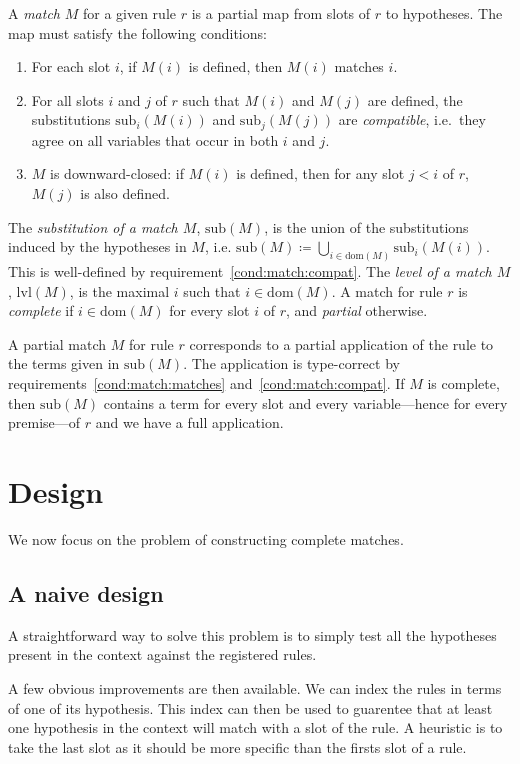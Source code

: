 \documentclass[runningheads]{llncs}
\newcommand{\dom}{\ensuremath{\mathrm{dom}}}
\newcommand{\sub}{\ensuremath{\mathrm{sub}}}
\newcommand{\lvl}{\ensuremath{\mathrm{lvl}}}
\begin{document}
A \textit{match} $M$ for a given rule $r$ is a partial map from slots of $r$ to hypotheses.
The map must satisfy the following conditions:
\begin{enumerate}
  \item\label{cond:match:matches} For each slot $i$, if $M(i)$ is defined, then $M(i)$ matches $i$.
  \item\label{cond:match:compat} For all slots $i$ and $j$ of $r$ such that $M(i)$ and $M(j)$ are defined, the substitutions $\sub_{i}(M(i))$ and $\sub_{j}(M(j))$ are \emph{compatible}, i.e.\ they agree on all variables that occur in both $i$ and $j$.
  \item\label{cond:match:closed} $M$ is downward-closed: if $M(i)$ is defined, then for any slot $j < i$ of $r$, $M(j)$ is also defined.
\end{enumerate}
The \emph{substitution of a match $M$}, $\sub(M)$, is the union of the substitutions induced by the hypotheses in $M$, i.e. $\sub(M) ≔ ⋃_{i ∈ \dom(M)}\sub_{i}(M(i))$.
This is well-defined by requirement~\ref{cond:match:compat}.
The \textit{level of a match $M$}, $\lvl(M)$, is the maximal $i$ such that $i ∈ \dom(M)$.
A match for rule $r$ is \textit{complete} if $i ∈ \dom(M)$ for every slot $i$ of $r$, and \emph{partial} otherwise.

A partial match $M$ for rule $r$ corresponds to a partial application of the rule to the terms given in $\sub(M)$.
The application is type-correct by requirements~\ref{cond:match:matches} and~\ref{cond:match:compat}.
If $M$ is complete, then $\sub(M)$ contains a term for every slot and every variable---hence for every premise---of $r$ and we have a full application.

\section{Design}

We now focus on the problem of constructing complete matches.

\subsection{A naive design}

A straightforward way to solve this problem is to simply test all the hypotheses present in the context against the registered rules.

A few obvious improvements are then available.
We can index the rules in terms of one of its hypothesis.
This index can then be used to guarentee that at least one hypothesis in the context will match with a slot of the rule.
A heuristic is to take the last slot as it should be more specific than the firsts slot of a rule.
\end{document}
